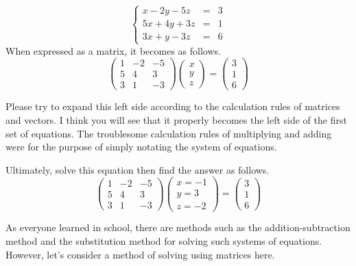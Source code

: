 \documentclass{ltjsbook}
\begin{document}
\[
	\left \{
	\begin{array}{lcl}
		x-2y-5z  & = & 3 \\
		5x+4y+3z & = & 1 \\
		3x+y-3z  & = & 6
	\end{array}
	\right .
\]
When expressed as a matrix, it becomes as follows.
\[
	\begin{pmatrix} 1 & -2 & -5 \\
                5 & 4  & 3  \\
                3 & 1  & -3\end{pmatrix}
	\begin{pmatrix} x \\ y \\ z \end{pmatrix}
	=
	\begin{pmatrix} 3 \\ 1 \\ 6 \end{pmatrix}
\]

Please try to expand this left side according to the calculation rules of matrices and vectors. I think you will see that it properly becomes the left side of the first set of equations. The troublesome calculation rules of multiplying and adding were for the purpose of simply notating the system of equations.

Ultimately, solve this equation then find the answer as follows.
\[
	\begin{pmatrix} 1 & -2 & -5 \\
                5 & 4  & 3  \\
                3 & 1  & -3\end{pmatrix}
	\begin{pmatrix} x=-1 \\ y=3 \\ z=-2 \end{pmatrix}
	=
	\begin{pmatrix} 3 \\ 1 \\ 6 \end{pmatrix}
\]


As everyone learned in school, there are methods such as the addition-subtraction method and the substitution method for solving such systems of equations. However, let's consider a method of solving using matrices here.
\end{document}
